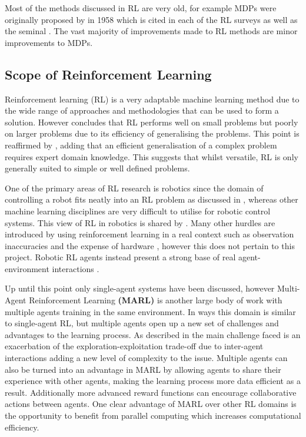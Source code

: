 \documentclass[hidelinks,journal]{IEEEtran}
\begin{document}
Most of the methods discussed in RL are very old, for example MDPs were originally proposed by \textcite{Bellman58} in 1958 which is cited in each of the RL surveys \textcite{Kaelbling96, Busoniu08, Kober13} as well as the seminal \textcite{Sutton18}. The vast majority of improvements made to RL methods are minor improvements to MDPs.
\subsection{Scope of Reinforcement Learning}
\label{subsec:lrScope}
Reinforcement learning (RL) is a very adaptable machine learning method due to the wide range of approaches and methodologies that can be used to form a solution. However \textcite{Kaelbling96} concludes that RL performs well on small problems but poorly on larger problems due to its efficiency of generalising the problems. This point is reaffirmed by \textcite{Wirth17}, adding that an efficient generalisation of a complex problem requires expert domain knowledge. This suggests that whilst versatile, RL is only generally suited to simple or well defined problems.

One of the primary areas of RL research is robotics since the domain of controlling a robot fits neatly into an RL problem as discussed in \textcite{Kober13}, whereas other machine learning disciplines are very difficult to utilise for robotic control systems. This view of RL in robotics is shared by \textcite{Smart02}. Many other hurdles are introduced by using reinforcement learning in a real context such as observation inaccuracies and the expense of hardware \parencite{Kober13}, however this does not pertain to this project. Robotic RL agents instead present a strong base of real agent-environment interactions \parencite{Kober13}.

Up until this point only single-agent systems have been discussed, however Multi-Agent Reinforcement Learning \textbf{(MARL)} is another large body of work with multiple agents training in the same environment. In ways this domain is similar to single-agent RL, but multiple agents open up a new set of challenges and advantages to the learning process. As described in \textcite{Busoniu08} the main challenge faced is an exacerbation of the exploration-exploitation trade-off due to inter-agent interactions adding a new level of complexity to the issue. Multiple agents can also be turned into an advantage in MARL by allowing agents to share their experience with other agents, making the learning process more data efficient as a result. Additionally more advanced reward functions can encourage collaborative actions between agents. One clear advantage of MARL over other RL domains is the opportunity to  benefit from parallel computing which increases computational efficiency.
\end{document}
